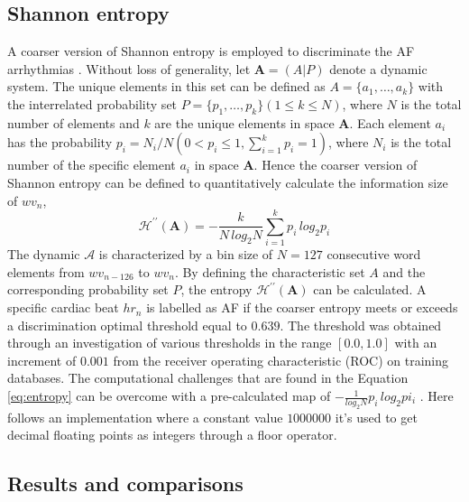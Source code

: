 \subsection{Shannon entropy}
\label{sec:entropy}
A coarser version of Shannon entropy is employed to discriminate the AF arrhythmias . Without loss of generality, let $\mathbf{A} = (A|P)$ denote a dynamic system. The unique elements in this set can be defined as $A = \{a_1, \ldots, a_k\}$ with the interrelated probability set $P = \{p_1, \ldots, p_k\} (1 \le k \le N)$, where $N$ is the total number of elements and $k$ are the unique elements in space $\mathbf{A}$. Each element $a_i$ has the probability $p_i = N_i/N (0 < p_i \le 1, \sum_{i=1}^{k}p_i=1)$, where $N_i$ is the total number of the specific element $a_i$ in space $\mathbf{A}$. Hence the coarser version of Shannon entropy can be defined to quantitatively calculate the information size of $wv_n$,
\begin{equation}\label{eq:entropy}
\mathcal{H}^{\prime\prime} (\mathbf{A}) = -\frac{k}{N \, log_2 N} \sum_{i=1}^{k}p_i \, log_2 p_i
\end{equation}
The dynamic $\mathcal{A}$ is characterized by a bin size of $N=127$ consecutive word elements from $wv_{n-126}$ to $wv_n$. By defining the characteristic set $A$ and the corresponding probability set $P$, the entropy $\mathcal{H}^{\prime\prime} (\mathbf{A})$ can be calculated. A specific cardiac beat $hr_n$ is labelled as AF if the coarser entropy meets or exceeds a discrimination optimal threshold equal to $0.639$. The threshold was obtained through an investigation of various thresholds in the range $[0.0, 1.0]$ with an increment of $0.001$ from the receiver operating characteristic (ROC) on training databases. 
The computational challenges that are found in the Equation \ref{eq:entropy} can be overcome with a pre-calculated map of $-\frac{1}{log_2 N}p_i \, log_2 pi_i$ \cite[p. 4]{zhou2015}. Here follows an implementation where a constant value $1000000$ it's used to get decimal floating points as integers through a floor operator.



\subsection{Results and comparisons}
